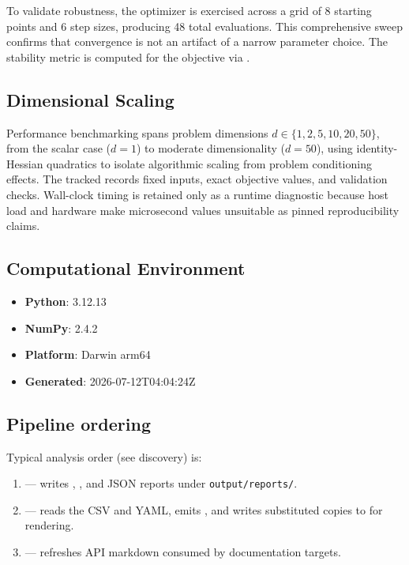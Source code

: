 \documentclass[
  english,
]{article}
\providecommand{\tightlist}{%
  \setlength{\itemsep}{0pt}\setlength{\parskip}{0pt}}
\begin{document}
To validate robustness, the optimizer is exercised across a grid of 8
starting points and 6 step sizes, producing 48 total evaluations. This
comprehensive sweep confirms that convergence is not an artifact of a
narrow parameter choice. The stability metric is computed for the
 objective via
.

\subsection{Dimensional Scaling}\label{dimensional-scaling}

Performance benchmarking spans problem dimensions
\(d \in \{1, 2, 5, 10, 20, 50\}\), from the scalar case (\(d = 1\)) to
moderate dimensionality (\(d = 50\)), using identity-Hessian quadratics
to isolate algorithmic scaling from problem conditioning effects. The
tracked  records
fixed inputs, exact objective values, and validation checks. Wall-clock
timing is retained only as a runtime diagnostic because host load and
hardware make microsecond values unsuitable as pinned reproducibility
claims.

\subsection{Computational Environment}\label{computational-environment}

\begin{itemize}
\tightlist
\item
  \textbf{Python}: 3.12.13
\item
  \textbf{NumPy}: 2.4.2
\item
  \textbf{Platform}: Darwin arm64
\item
  \textbf{Generated}: 2026-07-12T04:04:24Z
\end{itemize}

\subsection{Pipeline ordering}\label{pipeline-ordering}

Typical  analysis order (see
 discovery) is:

\begin{enumerate}
\def\labelenumi{\arabic{enumi}.}
\tightlist
\item
   --- writes
  ,
  , and JSON reports under
  \texttt{output/reports/}.
\item
   --- reads the CSV and
  YAML, emits , and
  writes substituted copies to  for
  rendering.
\item
   --- refreshes API markdown consumed by
  documentation targets.
\end{enumerate}
\end{document}
